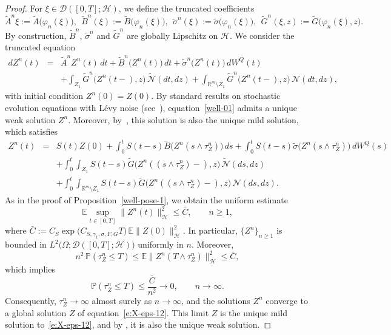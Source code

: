 \documentclass[11pt]{article}
\theoremstyle{plain}
\numberwithin{equation}{section}
\begin{document}
\begin{proof}
For $\xi\in\mathcal D([0,T];\mathcal H)$, we define the truncated coefficients
\[
\tilde A^n\xi:=\tilde A\big(\varphi_n(\xi)\big),~~
\tilde B^n(\xi):=\tilde B\big(\varphi_n(\xi)\big),~~
\tilde\sigma^n(\xi):=\tilde\sigma\big(\varphi_n(\xi)\big),~~
\tilde G^n(\xi,z):=\tilde G\big(\varphi_n(\xi),z\big).
\]
By construction, $\tilde B^n$, $\tilde\sigma^n$ and $\tilde G^n$ are globally Lipschitz on $\mathcal H$. We consider the truncated equation
\begin{eqnarray}\label{well-01}
dZ^n(t)&=& \tilde A^n Z^n(t)\,dt+ \tilde B^n\big(Z^n(t)\big)\,dt+ \tilde\sigma^n\big(Z^n(t)\big)\,dW^Q(t) \nonumber\\
&&+ \int_{Z_1}\tilde G^n\big(Z^n(t-),z\big)\,\tilde{\mathcal N}(dt,dz)+ \int_{\mathbb R^m\setminus Z_1}\tilde G^n\big(Z^n(t-),z\big)\,{\mathcal N}(dt,dz),
\end{eqnarray}
with initial condition $Z^n(0)=Z(0)$. By standard results on stochastic evolution equations with L\'evy noise
(see~\cite{linjunbo}), equation~\eqref{well-01} admits a unique weak solution $Z^n$.
Moreover, by~\cite[Theorem~8.2]{peszat}, this solution is also the unique mild solution, which satisfies
\begin{eqnarray}\label{well-1}
Z^n(t)&=& S(t)Z(0)+ \int_0^t S(t-s)\tilde B\big(Z^n(s\wedge\tau_Z^n)\big)\,ds+ \int_0^t S(t-s)\tilde\sigma\big(Z^n(s\wedge\tau_Z^n)\big)\,dW^Q(s)\nonumber\\
&&+ \int_0^t\!\!\int_{Z_1}S(t-s)\tilde G\big(Z^n((s\wedge\tau_Z^n)-),z\big)\,\tilde{\mathcal N}(ds,dz)\nonumber\\
&&+ \int_0^t\!\!\int_{\mathbb R^m\setminus Z_1}S(t-s)\tilde G\big(Z^n((s\wedge\tau_Z^n)-),z\big)\,{\mathcal N}(ds,dz).
\end{eqnarray}
As in the proof of Proposition~\ref{well-pose-1}, we obtain the uniform estimate
\begin{equation}\label{well-02}
\mathbb E\sup_{t\in[0,T]}\|Z^n(t)\|_{\mathcal H}^2 \le \bar C, \qquad n\ge1,
\end{equation}
where \(\bar C:= C_S \exp\!\big(C_{S,\gamma_1,\sigma,F,G}T\big)\,\mathbb E\|Z(0)\|_{\mathcal H}^2 .\)
In particular, $\{Z^n\}_{n\ge1}$ is bounded in
$L^2\big(\Omega;\mathcal D([0,T];\mathcal H)\big)$ uniformly in $n$.
Moreover,
\[
n^2\,\mathbb P(\tau_Z^n\le T) \le\mathbb E\|Z^n(T\wedge\tau_Z^n)\|_{\mathcal H}^2 \le \bar C,
\]
which implies
\[
\mathbb P(\tau_Z^n\le T) \le \frac{\bar C}{n^2}\longrightarrow 0,\qquad n\to\infty .
\]
Consequently, $\tau_Z^n\to\infty$ almost surely as $n\to\infty$, and the solutions $Z^n$ converge to a global solution $Z$ of
equation~\eqref{e:X-eps-12}. This limit $Z$ is the unique mild solution to~\eqref{e:X-eps-12}, and by \cite[Theorem~8.2]{peszat}, it is also the unique weak solution.

\end{proof}
\end{document}
